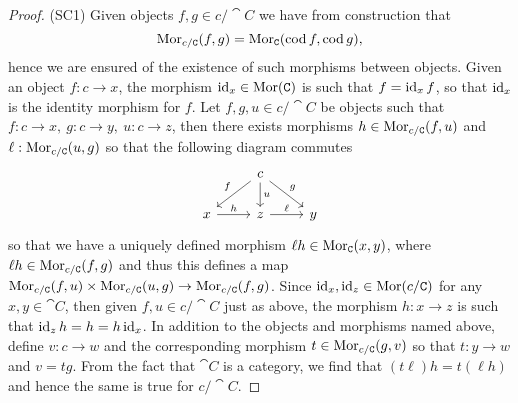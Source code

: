 \begin{proof}
    (SC1) Given objects \(f, g \in c/\cat C\) we have from construction that
    \[
        \operatorname{Mor}_{c/\texttt C}(f, g) = \operatorname{Mor}_{\texttt C}(\operatorname{cod} f, \operatorname{cod} g),
    \]
    hence we are
    ensured of the existence of such morphisms between objects. Given an object
    \(f: c \to x\), the morphism \(\operatorname{id}_x \in \operatorname{Mor}(\texttt C)\) is such that \(f =
    \operatorname{id}_x  f\), so that \(\operatorname{id}_x\) is the identity morphism for \(f\). Let
    \(f, g, u \in c/\cat C\) be objects such that \(f: c \to x,\ g: c \to y,\ u: c
    \to z\), then there exists morphisms \(h \in \operatorname{Mor}_{c/\texttt C}(f, u)\) and
    \(\ell: \operatorname{Mor}_{c/\texttt C}(u, g)\) so that the following diagram commutes
    \[
        \begin{tikzcd}
            &c \ar[dl, swap, "f"] \ar[d, "u"] \ar[dr, "g"] & \\
            x \ar[r, "h"]
            &z \ar[r, "\ell"]
            &y
        \end{tikzcd}
    \]
    so that we have a uniquely defined morphism \(\ell  h \in \operatorname{Mor}_{\texttt
        C}(x, y)\), where \(\ell  h \in \operatorname{Mor}_{c/\texttt C}(f, g)\) and
    thus this defines a map \(\operatorname{Mor}_{c/\texttt C}(f, u) \times \operatorname{Mor}_{c/\texttt C}(u, g)
    \to \operatorname{Mor}_{c/\texttt C}(f, g)\). Since \(\operatorname{id}_x, \operatorname{id}_z \in \operatorname{Mor}(c/\texttt C)\) for any
    \(x, y \in \cat C\), then given \(f, u \in c/\cat C\) just as above, the
    morphism \(h: x \to z\) is such that \(\operatorname{id}_z  h = h = h  \operatorname{id}_x\). In
    addition to the objects and morphisms named above, define \(v: c \to w\) and
    the corresponding morphism \(t \in \operatorname{Mor}_{c/\texttt C}(g, v)\) so that \(t: y \to
    w\) and \(v = t  g\). From the fact that \(\cat C\) is a category, we
    find that \((t  \ell)  h = t  (\ell  h)\) and hence the
    same is true for \(c/\cat C\).


\end{proof}
